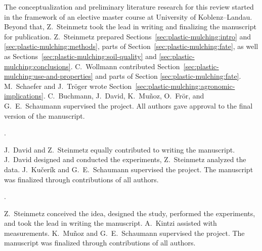 \begin{description}
	\setlength\itemsep{0em}
	\item[Author contributions:] The conceptualization and preliminary literature research for this review started in the framework of an elective master course at University of Koblenz--Landau. Beyond that, Z.~Steinmetz took the lead in writing and finalizing the manuscript for publication. Z.~Steinmetz prepared Sections~\ref{sec:plastic-mulching:intro} and \ref{sec:plastic-mulching:methods}, parts of Section~\ref{sec:plastic-mulching:fate}, as well as Sections~\ref{sec:plastic-mulching:soil-quality} and \ref{sec:plastic-mulching:conclusions}. C.~Wollmann contributed Section~\ref{sec:plastic-mulching:use-and-properties} and parts of Section \ref{sec:plastic-mulching:fate}. M.~Schaefer and J.~Tröger wrote Section~\ref{sec:plastic-mulching:agronomic-implications}. C.~Buchmann, J.~David, K.~Muñoz, O.~Frör, and G.~E.~Schaumann supervised the project. All authors gave approval to the final version of the manuscript.
\end{description}

\vspace{0.5\baselineskip}
\noindent{}.

\begin{description}
	\setlength\itemsep{0em}
	\item[Author contributions:] J.~David and Z.~Steinmetz equally contributed to writing the manuscript. J.~David designed and conducted the experiments, Z.~Steinmetz analyzed the data. J.~Kučerík and G.~E.~Schaumann supervised the project. The manuscript was finalized through contributions of all authors.
\end{description}

\vspace{0.5\baselineskip}
\noindent{}.

\begin{description}
	\setlength\itemsep{0em}
	\item[Author contributions:] Z.~Steinmetz conceived the idea, designed the study, performed the experiments, and took the lead in writing the manuscript. A.~Kintzi assisted with measurements. K.~Muñoz and G.~E.~Schaumann supervised the project. The manuscript was finalized through contributions of all authors.
\end{description}


